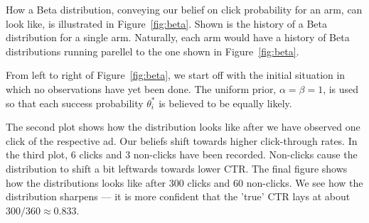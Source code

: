 \documentclass{article} %
\begin{document}
How a Beta distribution, conveying our belief on click probability for an arm,
can look like, is illustrated in Figure~\ref{fig:beta}. Shown is the history of
a Beta distribution for a single arm. Naturally, each arm would have a history
of Beta distributions running parellel to the one shown in
Figure~\ref{fig:beta}.

From left to right of Figure~\ref{fig:beta}, we start off with the initial
situation in which no observations have yet been done. The uniform prior,
$\alpha = \beta = 1$, is used so that each success probability $\theta^*_i$ is
believed to be equally likely.

The second plot shows how the distribution looks like after we have observed
one click of the respective ad. Our beliefs shift towards higher click-through
rates. In the third plot, 6 clicks and 3 non-clicks have been recorded.
Non-clicks cause the distribution to shift a bit leftwards towards lower CTR.
The final figure shows how the distributions looks like after 300 clicks and 60
non-clicks. We see how the distribution sharpens --- it is more confident that
the 'true' CTR lays at about $300 / 360 \approx 0.833$.
\end{document}
